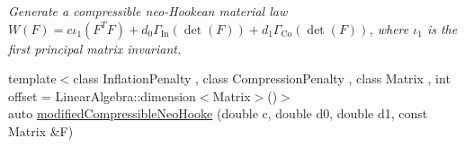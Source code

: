 \begin{DoxyCompactItemize}
\begin{DoxyCompactList}\small\item\em Generate a compressible neo-\/\-Hookean material law $ W(F)=c\iota_1(F^T F)+d_0\Gamma_\mathrm{In}(\det(F))+d_1\Gamma_\mathrm{Co}(\det(F)) $, where $\iota_1$ is the first principal matrix invariant. \end{DoxyCompactList}\item 
\hypertarget{group__Rubber_gac10942df03f037afdf0a81d330361a6b}{{\footnotesize template$<$class Inflation\-Penalty , class Compression\-Penalty , class Matrix , int offset = Linear\-Algebra\-::dimension$<$\-Matrix$>$()$>$ }\\auto \hyperlink{group__Rubber_gac10942df03f037afdf0a81d330361a6b}{modified\-Compressible\-Neo\-Hooke} (double c, double d0, double d1, const Matrix \&F)}\label{group__Rubber_gac10942df03f037afdf0a81d330361a6b}


\end{DoxyCompactItemize}
